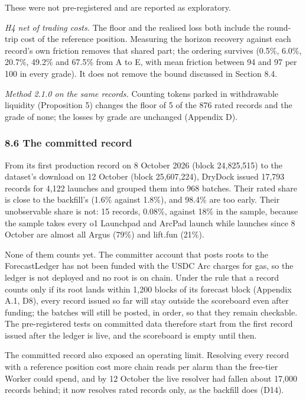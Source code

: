 These were not pre-registered and are reported as exploratory.

\emph{H4 net of trading costs.} The floor and the realised loss both include the round-trip cost of the reference position. Measuring the horizon recovery against each record's own friction removes that shared part; the ordering survives (0.5\%, 6.0\%, 20.7\%, 49.2\% and 67.5\% from A to E, with mean friction between 94 and 97 per 100 in every grade). It does not remove the bound discussed in Section 8.4.

\emph{Method 2.1.0 on the same records.} Counting tokens parked in withdrawable liquidity (Proposition 5) changes the floor of 5 of the 876 rated records and the grade of none; the losses by grade are unchanged (Appendix D).

\subsubsection{8.6 The committed record}\label{the-committed-record}

From its first production record on 8 October 2026 (block 24,825,515) to the dataset's download on 12 October (block 25,607,224), DryDock issued 17,793 records for 4,122 launches and grouped them into 968 batches. Their rated share is close to the backfill's (1.6\% against 1.8\%), and 98.4\% are too early. Their unobservable share is not: 15 records, 0.08\%, against 18\% in the sample, because the sample takes every o1 Launchpad and ArcPad launch while launches since 8 October are almost all Argus (79\%) and lift.fun (21\%).

None of them counts yet. The committer account that posts roots to the ForecastLedger has not been funded with the USDC Arc charges for gas, so the ledger is not deployed and no root is on chain. Under the rule that a record counts only if its root lands within 1,200 blocks of its forecast block (Appendix A.1, D8), every record issued so far will stay outside the scoreboard even after funding; the batches will still be posted, in order, so that they remain checkable. The pre-registered tests on committed data therefore start from the first record issued after the ledger is live, and the scoreboard is empty until then.

The committed record also exposed an operating limit. Resolving every record with a reference position cost more chain reads per alarm than the free-tier Worker could spend, and by 12 October the live resolver had fallen about 17,000 records behind; it now resolves rated records only, as the backfill does (D14).

